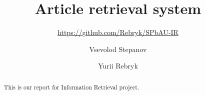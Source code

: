 \documentclass[sigconf]{acmart}
\begin{document}
\title{Article retrieval system}
\subtitle{\url{https://github.com/Rebryk/SPbAU-IR}}


\author{Vsevolod Stepanov}

\author{Yurii Rebryk}


\begin{abstract}
    This is our report for Information Retrieval project.
\end{abstract}

\maketitle




 
\end{document}
